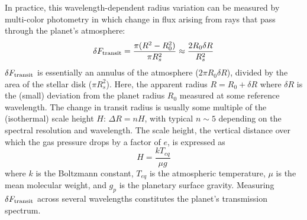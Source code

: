 In practice, this wavelength-dependent radius variation can be measured by multi-color photometry in which change in flux arising from rays that pass through the planet's atmosphere:
\begin{equation} 
\delta F_{\rm{transit}} = \frac{\pi(R^2-R^2_0)}{\pi R^2_s} \approx \frac{2R_0\delta R}{R^2_s}
\end{equation}
$\delta F_{\rm{transit}}$ is essentially an annulus of the atmosphere ($2\pi R_0 \delta R$), divided by the area of the stellar disk ($\pi R^2_s$). Here, the apparent radius $R=R_0+\delta R$ where $\delta R$ is the (small) deviation from the planet radius $R_0$ measured at some reference wavelength. The change in transit radius is usually some multiple of the (isothermal) scale height $H$: $\Delta R = nH$, with typical $n\sim 5$ depending on the spectral resolution and wavelength. 
The scale height, the vertical distance over which the gas pressure drops by a factor of $e$, is expressed as
\begin{equation} 
\label{eq:H}
H=\frac{kT_{eq}}{\mu g}
\end{equation}
where $k$ is the Boltzmann constant, $T_{eq}$ is the atmospheric temperature, $\mu$ is the mean molecular weight, and $g_p$ is the planetary surface gravity. Measuring $\delta F_{\rm{transit}}$ across several wavelengths constitutes the planet's transmission spectrum. 


